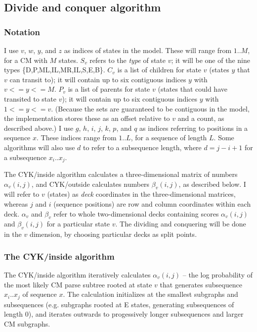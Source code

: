 \documentclass[11pt]{article}
\begin{document}

\subsection{Divide and conquer algorithm}

\subsubsection{Notation}

I use $v$, $w$, $y$, and $z$ as indices of states in the model. These
will range from $1..M$, for a CM with $M$ states. $S_v$ refers to the
\emph{type} of state $v$; it will be one of the nine types
\{D,P,ML,IL,MR,IL,S,E,B\}. $C_v$ is a list of children for state $v$
(states $y$ that $v$ can transit to); it will contain up to six
contiguous indices $y$ with $v <= y <= M$. $P_v$ is a list of parents
for state $v$ (states that could have transited to state $v$); it will
contain up to six contiguous indices $y$ with $1 <= y <= v$. (Because
the sets are guaranteed to be contiguous in the model, the
implementation stores these as an offset relative to $v$ and a count,
as described above.) I use $g$, $h$, $i$, $j$, $k$, $p$, and $q$ as
indices referring to positions in a sequence $x$. These indices range
from $1..L$, for a sequence of length $L$. Some algorithms will also
use $d$ to refer to a subsequence length, where $d = j-i+1$ for a
subsequence $x_i..x_j$.

The CYK/inside algorithm calculates a three-dimensional matrix of
numbers $\alpha_v(i,j)$, and CYK/outside calculates numbers
$\beta_v(i,j)$, as described below. I will refer to $v$ (states) as
\emph{deck} coordinates in the three-dimensional matrices, whereas $j$
and $i$ (sequence positions) are row and column coordinates within
each deck.  $\alpha_{v}$ and $\beta_{v}$ refer to whole
two-dimensional decks containing scores $\alpha_v(i,j)$ and
$\beta_v(i,j)$ for a particular state $v$. The dividing and conquering
will be done in the $v$ dimension, by choosing particular decks as
split points.

\subsubsection{The CYK/inside algorithm}

The CYK/inside algorithm iteratively calculates $\alpha_v(i,j)$ -- the
log probability of the most likely CM parse subtree rooted at state
$v$ that generates subsequence $x_i..x_j$ of sequence $x$. The
calculation initializes at the smallest subgraphs and subsequences
(e.g. subgraphs rooted at E states, generating subsequences of length
0), and iterates outwards to progessively longer subsequences and
larger CM subgraphs.
\end{document}
